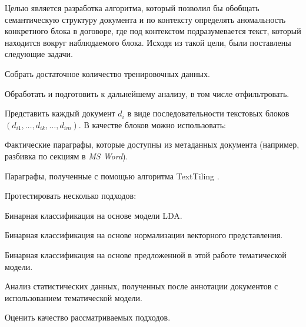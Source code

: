 \documentclass[12pt]{article}
\begin{document}
Целью является разработка алгоритма, который позволил бы обобщать семантическую структуру документа и по контексту определять аномальность конкретного блока в договоре, где под контекстом подразумевается текст, который находится вокруг наблюдаемого блока. Исходя из такой цели, были поставлены следующие задачи.
\par\begin{enumerate}{
	\vspace{-0.2cm}\item Собрать достаточное количество тренировочных данных. 
	\vspace{-0.2cm}\item Обработать и подготовить к дальнейшему анализу, в том числе отфильтровать. 
	\vspace{-0.2cm}\item Представить каждый документ $d_i$ в виде последовательности текстовых блоков $(d_{i1}, \ldots, d_{ik}, \ldots, d_{im})$. В качестве блоков можно использовать:
	\par\begin{itemize}{
				\vspace{-0.2cm}\item Фактические параграфы, которые доступны из метаданных документа (например, разбивка по секциям в \textit{MS Word}).
				\vspace{-0.2cm}\item Параграфы, полученные с помощью алгоритма TextTiling  \cite{texttiling}.
	}\end{itemize}
	\vspace{-0.2cm}\item Протестировать несколько подходов:
	\par\begin{itemize}{
			\vspace{-0.2cm}\item Бинарная классификация на основе модели LDA.
			\vspace{-0.2cm}\item Бинарная классификация на основе нормализации векторного представления.
			\vspace{-0.2cm}\item Бинарная классификация на основе предложенной в этой работе тематической модели.
			\vspace{-0.2cm}\item Анализ статистических данных, полученных после аннотации документов с использованием тематической модели.
	}\end{itemize}
	\vspace{-0.2cm}\item Оценить качество рассматриваемых подходов.
}\end{enumerate}
\end{document}
